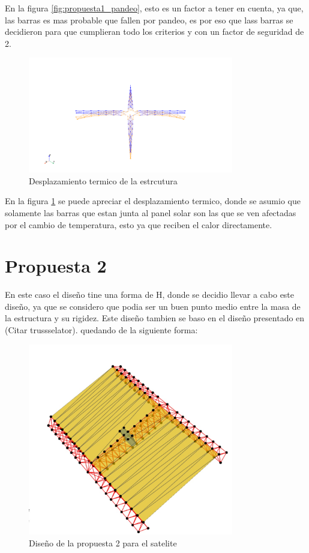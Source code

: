 En la figura \ref{fig:propuesta1_pandeo}, esto es un factor a tener en cuenta, ya que, las barras es mas probable que fallen por pandeo, es por eso que lass barras se decidieron para que cumplieran todo los criterios y con un factor de seguridad de 2.

\begin{figure}[H]
    \centering
    \includegraphics[width=0.8\textwidth]{GRAFICOS_DISENO_LUKAS/desplazamiento_termico.png}
    \caption{Desplazamiento termico de la estrcutura}
    \label{fig:propuesta1_termico}
\end{figure}

En la figura \ref{fig:propuesta1_termico} se puede apreciar el desplazamiento termico, donde se asumio que solamente las barras que estan junta al panel solar son las que se ven afectadas por el cambio de temperatura, esto ya que reciben el calor directamente.

\newpage
\section{Propuesta 2}

En este caso el diseño tine una forma de H, donde se decidio llevar a cabo este diseño, ya que se considero que podia ser un buen punto medio entre la masa de la estructura y su rigidez. Este diseño tambien se baso en el diseño presentado en (Citar trussselator). quedando de la siguiente forma:

\begin{figure}[H]
    \centering
    \includegraphics[width=0.8\textwidth]{GRAFICOS_DISENO_BENO/propuesta2.png}
    \caption{Diseño de la propuesta 2 para el satelite}
    \label{fig:propuesta2}
\end{figure}

